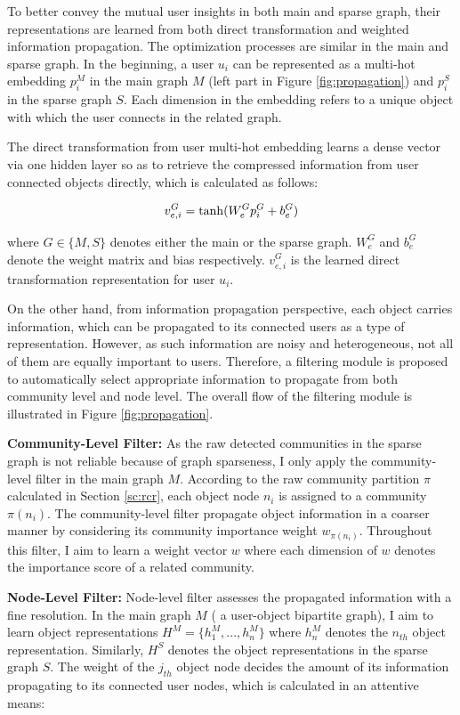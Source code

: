 To better convey the mutual user insights in both main and sparse graph, their representations are learned from both direct transformation and weighted information propagation. The optimization processes are similar in the main and sparse graph. In the beginning, a user $u_i$ can be represented as a multi-hot embedding $p_{i}^{M}$ in the main graph $M$ (left part in Figure \ref{fig:propagation}) and $p_{i}^{S}$ in the sparse graph $S$. Each dimension in the embedding refers to a unique object with which the user connects in the related graph. 

The direct transformation from user multi-hot embedding learns a dense vector via one hidden layer so as to retrieve the compressed  information from user connected objects directly, which is calculated as follows:

\begin{equation}
v_{e,i}^{G} = {\rm tanh}(W_e^Gp_i^G + b_e^G) 
\end{equation}

where $G \in \{M, S\}$ denotes either the main or the sparse graph. $W_e^G$ and $b_e^G$ denote the weight matrix and bias respectively. $v_{e,i}^{G}$ is the learned direct transformation representation for user $u_i$.

On the other hand, from information propagation perspective, each object carries information, which can be propagated to its connected users as a type of representation. However, as such information are noisy and heterogeneous, not all of them are equally important to users. Therefore, a filtering module is proposed to automatically select appropriate information to propagate from both community level and node level.  The overall flow of the filtering module is illustrated in Figure \ref{fig:propagation}.

\textbf{Community-Level Filter:} As the raw detected communities in the sparse graph is not reliable because of graph sparseness, I only apply the community-level filter in the main graph $M$. According to the raw community partition $\pi$ calculated in Section \ref{sc:rcr}, each object node $n_i$ is assigned to a community $\pi(n_i)$. The community-level filter propagate object information in a coarser manner by considering its community importance weight $w_{\pi(n_i)}$. Throughout this filter, I aim to learn a weight vector $w$ where each dimension of $w$ denotes the importance score of a related community. 


\textbf{Node-Level Filter:} Node-level filter assesses the propagated information with a fine resolution. In the main graph $M$ ( a user-object bipartite graph), I aim to learn object representations $H^M = \{h_1^M,...,h_n^M\}$ where $h_n^M$ denotes the $n_{th}$ object representation. Similarly, $H^S$ denotes the object representations in the sparse graph $S$. The weight of the $j_{th}$ object node decides the amount of its information propagating to its connected user nodes, which is calculated in an attentive means: 

